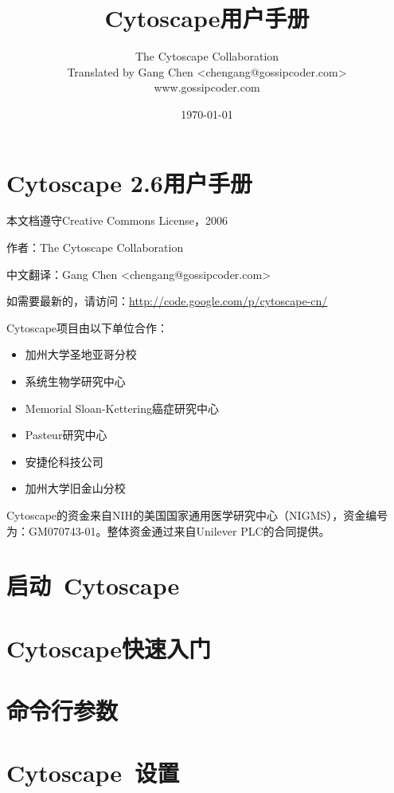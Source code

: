 \documentclass[a4paper, oneside]{book}
\author{The Cytoscape Collaboration \\ Translated by Gang Chen <chengang@gossipcoder.com> \\ www.gossipcoder.com}
\title{Cytoscape用户手册}
\date{\today}
\begin{document}
\begin{CJK}{UTF8}{gbsn}
\maketitle
\tableofcontents

\chapter*{Cytoscape 2.6用户手册}
本文档遵守Creative Commons License，2006

作者：The Cytoscape Collaboration

中文翻译：Gang Chen <chengang@gossipcoder.com>

如需要最新的，请访问：\url{http://code.google.com/p/cytoscape-cn/}

Cytoscape项目由以下单位合作：
\begin{itemize}
\item 加州大学圣地亚哥分校
\item 系统生物学研究中心
\item Memorial Sloan-Kettering癌症研究中心
\item Pasteur研究中心
\item 安捷伦科技公司
\item 加州大学旧金山分校
\end{itemize}

Cytoscape的资金来自NIH的美国国家通用医学研究中心（NIGMS），资金编号为：GM070743-01。整体资金通过来自Unilever PLC的合同提供。



\chapter{启动~Cytoscape}


\chapter{Cytoscape快速入门}


\chapter{命令行参数}


\chapter{Cytoscape~设置}



\end{CJK}
\end{document}
